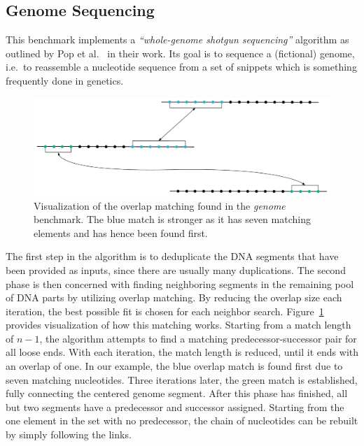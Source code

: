 \subsection{Genome Sequencing}
\label{sec:experiments:genome}
This benchmark implements a \emph{\enquote{whole-genome shotgun sequencing}} algorithm as outlined by Pop et al.~\cite{pop2002genome} in their work.
Its goal is to sequence a (fictional) genome, i.e.\ to reassemble a nucleotide sequence from a set of snippets which is something frequently done in genetics.

\begin{figure}[b]
    \includegraphics[width=\textwidth,keepaspectratio]{gfx/experiments-genome}
    \caption{Visualization of the overlap matching found in the \emph{genome} benchmark. The blue match is stronger as it has seven matching elements and has hence been found first.}
    \label{fig:experiments:genome-example}
\end{figure}

The first step in the algorithm is to deduplicate the DNA segments that have been provided as inputs, since there are usually many duplications.
The second phase is then concerned with finding neighboring segments in the remaining pool of DNA parts by utilizing overlap matching.
By reducing the overlap size each iteration, the best possible fit is chosen for each neighbor search.
Figure~\ref{fig:experiments:genome-example} provides visualization of how this matching works.
Starting from a match length of $n-1$, the algorithm attempts to find a matching predecessor-successor pair for all loose ends.
With each iteration, the match length is reduced, until it ends with an overlap of one.
In our example, the blue overlap match is found first due to seven matching nucleotides.
Three iterations later, the green match is established, fully connecting the centered genome segment.
After this phase has finished, all but two segments have a predecessor and successor assigned.
Starting from the one element in the set with no predecessor, the chain of nucleotides can be rebuilt by simply following the links.

